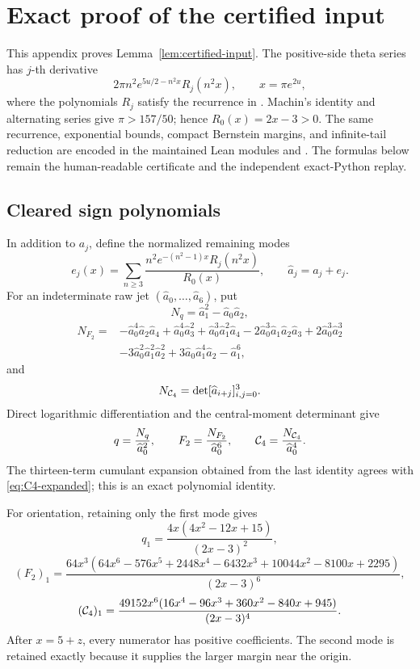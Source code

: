 \section{Exact proof of the certified input}\label{app:tail}

This appendix proves Lemma~\ref{lem:certified-input}. The positive-side
theta series has \(j\)-th derivative
\[
 2\pi n^2e^{5u/2-n^2x}R_j(n^2x),\qquad x=\pi e^{2u},
\]
where the polynomials \(R_j\) satisfy the recurrence in
. Machin's identity and alternating series give
\(\pi>157/50\); hence \(R_0(x)=2x-3>0\).
The same recurrence, exponential bounds, compact Bernstein margins, and
infinite-tail reduction are encoded in the maintained Lean modules
 and . The formulas
below remain the human-readable certificate and the independent exact-Python
replay.

\subsection{Cleared sign polynomials}

In addition to \(a_j\), define the normalized remaining modes
\[
 e_j(x)=\sum_{n\geq3}
 \frac{n^2e^{-(n^2-1)x}R_j(n^2x)}{R_0(x)},
 \qquad \widehat a_j=a_j+e_j.
\]
For an indeterminate raw jet \((\widehat a_0,\ldots,\widehat a_6)\), put
\[
 N_q=\widehat a_1^2-\widehat a_0\widehat a_2,
\]
\begin{align*}
N_{F_2}={}&-\widehat a_0^4\widehat a_2\widehat a_4
+\widehat a_0^4\widehat a_3^2
+\widehat a_0^3\widehat a_1^2\widehat a_4
-2\widehat a_0^3\widehat a_1\widehat a_2\widehat a_3
+2\widehat a_0^3\widehat a_2^3\\
&-3\widehat a_0^2\widehat a_1^2\widehat a_2^2
+3\widehat a_0\widehat a_1^4\widehat a_2-\widehat a_1^6,
\end{align*}
and
\[
 N_{\mathcal{C}_4}=\det[\widehat a_{i+j}]_{i,j=0}^3.
\]
Direct logarithmic differentiation and the central-moment determinant give
\begin{equation}\label{eq:raw-signs}
 q=\frac{N_q}{\widehat a_0^2},\qquad
 F_2=\frac{N_{F_2}}{\widehat a_0^6},\qquad
 \mathcal{C}_4=\frac{N_{\mathcal{C}_4}}{\widehat a_0^4}.
\end{equation}
The thirteen-term cumulant expansion obtained from the last identity agrees
with \eqref{eq:C4-expanded}; this is an exact polynomial identity.

For orientation, retaining only the first mode gives
\[
q_1=\frac{4x(4x^2-12x+15)}{(2x-3)^2},
\]
\[
(F_2)_1=\frac{64x^3(64x^6-576x^5+2448x^4-6432x^3
+10044x^2-8100x+2295)}{(2x-3)^6},
\]
\[
(\mathcal{C}_4)_1=\frac{49152x^6(16x^4-96x^3+360x^2-840x+945)}{(2x-3)^4}.
\]
After \(x=5+z\), every numerator has positive coefficients. The second
mode is retained exactly because it supplies the larger margin near the
origin.

